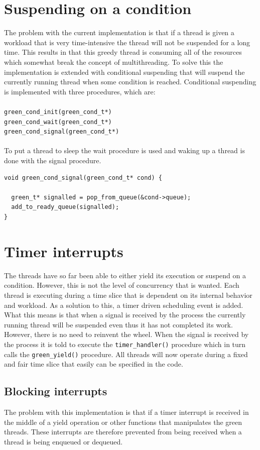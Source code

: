 \documentclass{article}
\begin{document}
\section{Suspending on a condition}
The problem with the current implementation is that if a thread is given a workload that is very time-intensive the thread will not be suspended for a long time. This results in that this greedy thread is consuming all of the resources which somewhat break the concept of multithreading. To solve this the implementation is extended with conditional suspending that will suspend the currently running thread when some condition is reached. 
Conditional suspending is implemented with three procedures, which are:\\\\\texttt{green\_cond\_init(green\_cond\_t*)}
\\\texttt{green\_cond\_wait(green\_cond\_t*)}
\\\texttt{green\_cond\_signal(green\_cond\_t*)}
\\\\To put a thread to sleep the wait procedure is used and waking up a thread is done with the signal procedure.

\begin{verbatim}
void green_cond_signal(green_cond_t* cond) {

  green_t* signalled = pop_from_queue(&cond->queue);
  add_to_ready_queue(signalled);
}
\end{verbatim}

\section{Timer interrupts}
The threads have so far been able to either yield its execution or suspend on a condition. However, this is not the level of concurrency that is wanted. Each thread is executing during a time slice that is dependent on its internal behavior and workload. As a solution to this, a timer driven scheduling event is added. What this means is that when a signal is received by the process the currently running thread will be suspended even thus it has not completed its work. However, there is no need to reinvent the wheel. When the signal is received by the process it is told to execute the \texttt{timer\_handler()} procedure which in turn calls the \texttt{green\_yield()} procedure. All threads will now operate during a fixed and fair time slice that easily can be specified in the code. 

\subsection{Blocking interrupts}
The problem with this implementation is that if a timer interrupt is received in the middle of a yield operation or other functions that manipulates the green threads. These interrupts are therefore prevented from being received when a thread is being enqueued or dequeued. 
\end{document}
